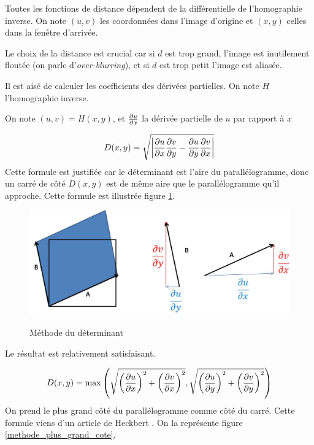 
Toutes les fonctions de distance dépendent de la différentielle de l'homographie inverse.
On note $(u,v)$ les coordonnées dans l'image d'origine et $(x,y)$ celles dans la fenêtre d'arrivée.

Le choix de la distance est crucial car si $d$ est trop grand, l'image est inutilement floutée (on parle d'\emph{over-blurring}), et si $d$ est trop petit l'image est aliasée.

Il est aisé de calculer les coefficients des dérivées partielles. On note $H$ l'homographie inverse.



On note $(u,v)=H(x,y)$, et $\frac{\partial u}{\partial x}$ la dérivée partielle de $u$ par rapport à $x$

$$D(x,y) = \sqrt{ \left|\frac{\partial u}{\partial x}\frac{\partial v}{\partial y}-\frac{\partial u}{\partial y}\frac{\partial v}{\partial x}\right| }$$
Cette formule est justifiée car le déterminant est l'aire du parallélogramme, donc un carré de côté $D(x,y)$ est de même aire que le parallélogramme qu'il approche. Cette formule est illustrée figure \ref{methode_determinant}.

\begin{figure}[h!]
\centering
\caption{Méthode du déterminant}
\includegraphics[scale=0.5]{methode_determinant.jpg}
\label{methode_determinant}
\end{figure}


Le résultat est relativement satisfaisant.


$$ D(x,y) = \max \left(\sqrt{\left(\frac{\partial u}{\partial x}\right)^2 + \left(\frac{\partial v}{\partial x}\right)^2},\sqrt{\left(\frac{\partial u}{\partial y}\right)^2 + \left(\frac{\partial v}{\partial y}\right)^2}\right)$$
On prend le plus grand côté du parallélogramme comme côté du carré. Cette formule viens d'un article de Heckbert \cite{heckbert1983texture}. On la représente figure \ref{methode_plus_grand_cote}.

